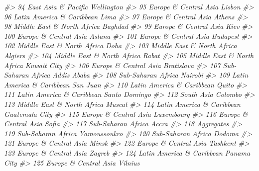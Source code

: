 \documentclass[
  xelatex, ja=standard]{bxjsbook}
\newenvironment{Shaded}{\begin{snugshade}}{\end{snugshade}}
\newcommand{\CommentTok}[1]{\textcolor[rgb]{0.56,0.35,0.01}{\textit{#1}}}
\theoremstyle{definition}
\theoremstyle{definition}
\theoremstyle{definition}
\theoremstyle{definition}
\theoremstyle{remark}
\begin{document}
\begin{Shaded}
\begin{Highlighting}[]
\CommentTok{\#\textgreater{} 94         East Asia \& Pacific          Wellington}
\CommentTok{\#\textgreater{} 95       Europe \& Central Asia              Lisbon}
\CommentTok{\#\textgreater{} 96   Latin America \& Caribbean                Lima}
\CommentTok{\#\textgreater{} 97       Europe \& Central Asia              Athens}
\CommentTok{\#\textgreater{} 98  Middle East \& North Africa             Baghdad}
\CommentTok{\#\textgreater{} 99       Europe \& Central Asia                Kiev}
\CommentTok{\#\textgreater{} 100      Europe \& Central Asia              Astana}
\CommentTok{\#\textgreater{} 101      Europe \& Central Asia            Budapest}
\CommentTok{\#\textgreater{} 102 Middle East \& North Africa                Doha}
\CommentTok{\#\textgreater{} 103 Middle East \& North Africa             Algiers}
\CommentTok{\#\textgreater{} 104 Middle East \& North Africa               Rabat}
\CommentTok{\#\textgreater{} 105 Middle East \& North Africa         Kuwait City}
\CommentTok{\#\textgreater{} 106      Europe \& Central Asia          Bratislava}
\CommentTok{\#\textgreater{} 107         Sub{-}Saharan Africa         Addis Ababa}
\CommentTok{\#\textgreater{} 108         Sub{-}Saharan Africa             Nairobi}
\CommentTok{\#\textgreater{} 109  Latin America \& Caribbean            San Juan}
\CommentTok{\#\textgreater{} 110  Latin America \& Caribbean               Quito}
\CommentTok{\#\textgreater{} 111  Latin America \& Caribbean       Santo Domingo}
\CommentTok{\#\textgreater{} 112                 South Asia             Colombo}
\CommentTok{\#\textgreater{} 113 Middle East \& North Africa              Muscat}
\CommentTok{\#\textgreater{} 114  Latin America \& Caribbean      Guatemala City}
\CommentTok{\#\textgreater{} 115      Europe \& Central Asia          Luxembourg}
\CommentTok{\#\textgreater{} 116      Europe \& Central Asia               Sofia}
\CommentTok{\#\textgreater{} 117         Sub{-}Saharan Africa               Accra}
\CommentTok{\#\textgreater{} 118                 Aggregates                    }
\CommentTok{\#\textgreater{} 119         Sub{-}Saharan Africa        Yamoussoukro}
\CommentTok{\#\textgreater{} 120         Sub{-}Saharan Africa              Dodoma}
\CommentTok{\#\textgreater{} 121      Europe \& Central Asia               Minsk}
\CommentTok{\#\textgreater{} 122      Europe \& Central Asia            Tashkent}
\CommentTok{\#\textgreater{} 123      Europe \& Central Asia              Zagreb}
\CommentTok{\#\textgreater{} 124  Latin America \& Caribbean         Panama City}
\CommentTok{\#\textgreater{} 125      Europe \& Central Asia             Vilnius}

\end{Highlighting}
\end{Shaded}
\end{document}
